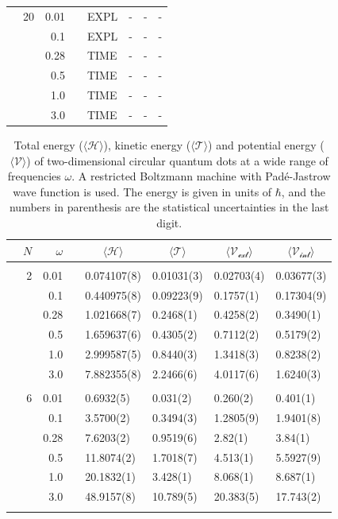 \begin{table}
\begin{tabularx}{\textwidth}{R{1.5cm}rrcR{2.3cm}R{2.3cm}R{2.3cm}R{2.3cm}}
		&20 & 0.01 && EXPL & - & - & - \\
		&& 0.1 && EXPL & - & - & - \\
		&& 0.28 && TIME & - & - & - \\
		&& 0.5 && TIME & - & - & - \\
		&& 1.0 && TIME & - & - & - \\
		&& 3.0 && TIME & - & - & - \\ \hline \hline
	\end{tabularx}
\end{table} 

\begin{table}
	\caption{Total energy ($\langle\mathcal{H}\rangle$), kinetic energy ($\langle\mathcal{T}\rangle$) and potential energy ($\langle\mathcal{V}\rangle$) of two-dimensional circular quantum dots at a wide range of frequencies $\omega$. A restricted Boltzmann machine with Padé-Jastrow wave function is used. The energy is given in units of $\hbar$, and the numbers in parenthesis are the statistical uncertainties in the last digit.}
	\label{tab:splitfrequencyQDRBMPJ}
	\begin{tabularx}{\textwidth}{R{1.5cm}rrcR{2.3cm}R{2.3cm}R{2.3cm}R{2.3cm}} \hline\hline
		& & $\omega$ &&  &  &  &  \\ \hline \\
		&2 & 0.01 && 0.074107(8) & 0.01031(3) & 0.02703(4) & 0.03677(3) \\
		&& 0.1 && 0.440975(8) & 0.09223(9) & 0.1757(1) & 0.17304(9) \\
		&& 0.28 && 1.021668(7) & 0.2468(1) & 0.4258(2) & 0.3490(1) \\
		&& 0.5 && 1.659637(6) & 0.4305(2) & 0.7112(2) & 0.5179(2)\\
		&& 1.0 && 2.999587(5) & 0.8440(3) & 1.3418(3) & 0.8238(2)\\
		&& 3.0 && 7.882355(8) & 2.2466(6) & 4.0117(6) & 1.6240(3) \\ \hdashline \\
		
		&6 & 0.01 && 0.6932(5) & 0.031(2) & 0.260(2) & 0.401(1) \\
		&& 0.1 && 3.5700(2) & 0.3494(3) & 1.2805(9) & 1.9401(8) \\
		&& 0.28 && 7.6203(2) & 0.9519(6) & 2.82(1) & 3.84(1) \\
		&& 0.5 && 11.8074(2) & 1.7018(7) & 4.513(1) & 5.5927(9) \\
		&& 1.0 && 20.1832(1) & 3.428(1) & 8.068(1) & 8.687(1) \\
		&& 3.0 && 48.9157(8) & 10.789(5) & 20.383(5) & 17.743(2) \\ \hdashline \\
		

\end{tabularx}
\end{table}

